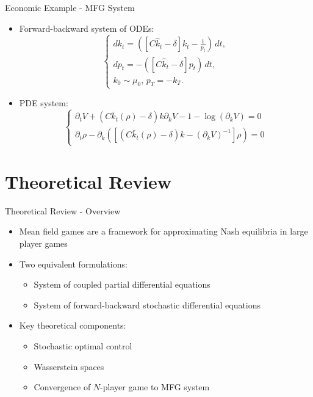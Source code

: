 \documentclass{beamer}
\begin{document}
\begin{frame}{Economic Example - MFG System}
\begin{itemize}
    \item Forward-backward system of ODEs:
    \begin{equation}
        \begin{cases}
             d k_t = \left(\left[ C {\hat k_t} - \delta \right] k_t - \frac{1}{p_t} \right)\, dt,\\
             d p_t = - \left( \left[C{\hat k_t} - \delta \right] p_t \right) \, dt, \\
             k_0 \sim \mu_0,\, p_T =  - k_T.         
        \end{cases}
    \end{equation}
    \item PDE system:
    \begin{equation}
        \begin{cases}
            \partial_t V +  \left(C {\bar k_t(\rho) - \delta}\right)k\partial_k V - 1  - \log(\partial_k V) = 0 \\
            \partial_t \rho - \partial_k \left( \left[ \left(C {\bar k_t}(\rho) - \delta\right) k - {(\partial_k V)}^{-1} \right]\rho \right) = 0
        \end{cases}
    \end{equation}
\end{itemize}
\end{frame}

\section{Theoretical Review}

\begin{frame}{Theoretical Review - Overview}
\begin{itemize}
    \item Mean field games are a framework for approximating Nash equilibria in large player games
    \item Two equivalent formulations:
    \begin{itemize}
        \item System of coupled partial differential equations
        \item System of forward-backward stochastic differential equations
    \end{itemize}
    \item Key theoretical components:
    \begin{itemize}
        \item Stochastic optimal control
        \item Wasserstein spaces
        \item Convergence of $N$-player game to MFG system
    \end{itemize}
\end{itemize}
\end{frame}
\end{document}
